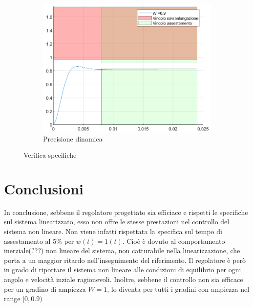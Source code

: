 \documentclass[a4paper, 11pt]{article}
\begin{document}
\begin{figure}[h!]
\begin{subfigure}[b]{0.3\textwidth}
		\centering
		\includegraphics[width=\textwidth]{./images/gradini_dinamico_high.png}
		\caption{Precisione dinamica}
		\label{fig:gradini_dinamico_high}
	\end{subfigure}
	
	\caption{Verifica specifiche}
	\label{fig:specifiche_gradini}
\end{figure}

\section{Conclusioni}

In conclusione, sebbene il regolatore progettato sia efficiace e rispetti le specifiche sul sistema linearizzato, esso non offre le stesse prestazioni nel controllo del sistema non lineare. Non viene infatti rispettata la specifica sul tempo di assestamento al 5\% per $w(t) = 1(t)$. Cioè è dovuto al comportamento inerziale(???) non lineare del sistema, non catturabile nella linearizzazione, che porta a un maggior ritardo nell'inseguimento del riferimento.
Il regolatore è però in grado di riportare il sistema non lineare alle condizioni di equilibrio per ogni angolo e velocità inziale ragionevoli.
Inoltre, sebbene il controllo non sia efficace per un gradino di ampiezza $W=1$, lo diventa per tutti i gradini con ampiezza nel range $[0, 0.9)$
\end{document}
